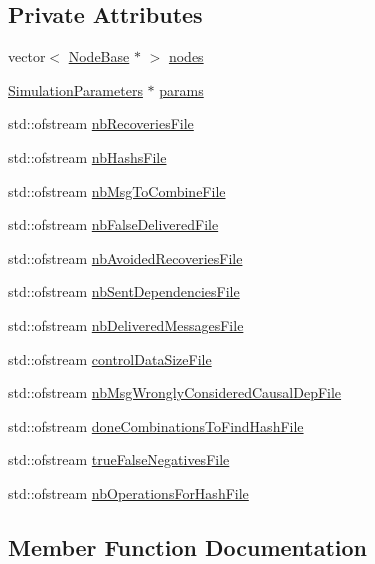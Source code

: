 \subsection*{Private Attributes}
\begin{DoxyCompactItemize}
\item 
vector$<$ \hyperlink{class_node_base}{Node\+Base} $\ast$ $>$ \hyperlink{class_stats_a815a3aa12c1529fe3d686038a2094fb2}{nodes}
\item 
\hyperlink{class_simulation_parameters}{Simulation\+Parameters} $\ast$ \hyperlink{class_stats_aec7570f722a5a0c6ed5f6b7208331dc1}{params}
\item 
std\+::ofstream \hyperlink{class_stats_a8c4fd9f4c18e074cbc4b69d611ec4977}{nb\+Recoveries\+File}
\item 
std\+::ofstream \hyperlink{class_stats_a47e0155a0aa3c62997eba6ebcdf77975}{nb\+Hashs\+File}
\item 
std\+::ofstream \hyperlink{class_stats_aca527547cfdce19906610acd9a3d26ca}{nb\+Msg\+To\+Combine\+File}
\item 
std\+::ofstream \hyperlink{class_stats_aded312adb1d366e759f216fc4f651b4c}{nb\+False\+Delivered\+File}
\item 
std\+::ofstream \hyperlink{class_stats_a2c1cbc31715b84b8e40206c5b3dc7c5f}{nb\+Avoided\+Recoveries\+File}
\item 
std\+::ofstream \hyperlink{class_stats_a26404a5110226c52970e3c261c6d8126}{nb\+Sent\+Dependencies\+File}
\item 
std\+::ofstream \hyperlink{class_stats_acf354d2603af85eff78594ca27e4f189}{nb\+Delivered\+Messages\+File}
\item 
std\+::ofstream \hyperlink{class_stats_ac31328205361c1581099a3ed67d5ca1a}{control\+Data\+Size\+File}
\item 
std\+::ofstream \hyperlink{class_stats_a3083f3da94481b94aaa8f53742834b97}{nb\+Msg\+Wrongly\+Considered\+Causal\+Dep\+File}
\item 
std\+::ofstream \hyperlink{class_stats_a3043ea15c3972ce785b42107fd9c1f5e}{done\+Combinations\+To\+Find\+Hash\+File}
\item 
std\+::ofstream \hyperlink{class_stats_ac9e180c84874fabd361396f3c9a166ae}{true\+False\+Negatives\+File}
\item 
std\+::ofstream \hyperlink{class_stats_a80fd6543223c0e25e2dbab085b1822f6}{nb\+Operations\+For\+Hash\+File}
\end{DoxyCompactItemize}


\subsection{Member Function Documentation}
\mbox{\label{class_stats_adaf8eb884008cdcb1f8a08df41566d16}} 
